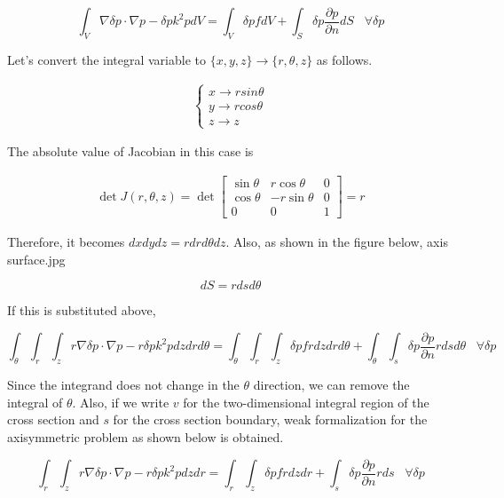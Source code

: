 \begin{equation}
\int_V \nabla\delta p \cdot\nabla p - \delta p k^2 p  dV = \int_V \delta p f dV + \int_S \delta p\frac{\partial p}{\partial n} dS \;\;\;\forall \delta p
\end{equation}

Let's convert the integral variable to $\{x,y,z\}\rightarrow \{r,\theta,z\}$ as follows.

\begin{eqnarray}
\left\{\begin{array}{l}
x\rightarrow rsin\theta\\
y\rightarrow rcos\theta\\
z\rightarrow z\end{array}\right.
\end{eqnarray}

The absolute value of Jacobian in this case is

\begin{eqnarray}
\det J(r,\theta,z)=\det \left[\begin{array}{lll}
\sin\theta & r \cos\theta & 0 \\
\cos\theta & -r\sin\theta & 0 \\
0 & 0 &  1
\end{array}\right] = r
\end{eqnarray}

Therefore, it becomes $dxdydz = r drd\theta dz$. Also, as shown in the figure below,
axis surface.jpg

\begin{equation}
dS = rdsd \theta
\end{equation}

If this is substituted above,

\begin{equation}
\int_\theta\int_r\int_z r\nabla\delta p \cdot\nabla p - r\delta p k^2 p  dzdrd\theta = \int_\theta\int_r\int_z \delta p f rdzdrd\theta + \int_\theta \int_s \delta p\frac{\partial p}{\partial n} rdsd\theta\;\;\;\forall \delta p
\end{equation}

Since the integrand does not change in the $\theta$ direction, we can remove the integral of $\theta$. Also, if we write $v$ for the two-dimensional integral region of the cross section and $s$ for the cross section boundary, weak formalization for the axisymmetric problem as shown below is obtained.

\begin{tcolorbox}[title=weak form of the Helmholtz equation on the axisymmetric problem]
\begin{equation}
\int_r\int_z r\nabla\delta p \cdot\nabla p - r\delta p k^2 p  dzdr = \int_r\int_z \delta p f rdzdr + \int_s \delta p\frac{\partial p}{\partial n} rds\;\;\;\forall \delta p
\end{equation}
\end{tcolorbox}


